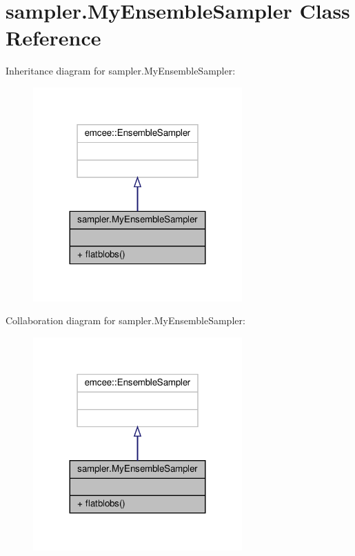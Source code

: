 \hypertarget{classsampler_1_1MyEnsembleSampler}{}\section{sampler.\+My\+Ensemble\+Sampler Class Reference}
\label{classsampler_1_1MyEnsembleSampler}


Inheritance diagram for sampler.\+My\+Ensemble\+Sampler\+:\nopagebreak
\begin{figure}[H]
\begin{center}
\leavevmode
\includegraphics[width=227pt]{dc/d23/classsampler_1_1MyEnsembleSampler__inherit__graph}
\end{center}
\end{figure}


Collaboration diagram for sampler.\+My\+Ensemble\+Sampler\+:\nopagebreak
\begin{figure}[H]
\begin{center}
\leavevmode
\includegraphics[width=227pt]{da/d7a/classsampler_1_1MyEnsembleSampler__coll__graph}
\end{center}
\end{figure}
